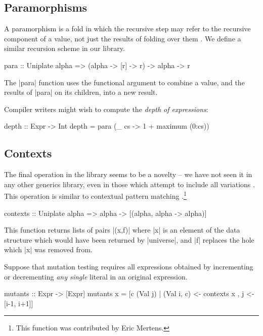 \subsection{Paramorphisms}

A paramorphism is a fold in which the recursive step may refer to the recursive component of a value, not just the results of folding over them \cite{meertens:paramorphisms}. We define a similar recursion scheme in our library.

\begin{code}
para :: Uniplate alpha => (alpha -> [r] -> r) -> alpha -> r
\end{code}

The |para| function uses the functional argument to combine a value, and the results of |para| on its children, into a new result.

\begin{example}
Compiler writers might wish to compute the \textit{depth of expressions}:

\begin{code}
depth :: Expr -> Int
depth = para (\_ cs -> 1 + maximum (0:cs))
\end{code}\codeexample
\end{example}

\subsection{Contexts}

The final operation in the library seems to be a novelty -- we have not seen it in any other generics library, even in those which attempt to include all variations \citep{ren:generic_recursion_toolbox}. This operation is similar to contextual pattern matching \citep{mohnen:context_patterns}.\footnote{This function was contributed by Eric Mertens.}

\begin{code}
contexts :: Uniplate alpha => alpha -> [(alpha, alpha -> alpha)]
\end{code}

This function returns lists of pairs |(x,f)| where |x| is an element of the data structure which would have been returned by |universe|, and |f| replaces the hole which |x| was removed from.

\begin{example}
Suppose that mutation testing requires all expressions obtained by incrementing or decrementing \textit{any single} literal in an original expression.

\begin{code}
mutants :: Expr -> [Expr]
mutants x =  [c (Val j)  |  (Val i, c) <- contexts x
                         ,  j <- [i-1, i+1]]
\end{code}
\end{example}

